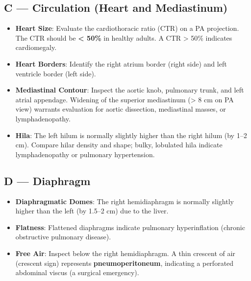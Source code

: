\subsection*{C --- Circulation (Heart and Mediastinum)}
\begin{itemize}
    \item \textbf{Heart Size}: Evaluate the cardiothoracic ratio (CTR) on a PA projection. The CTR should be \textbf{< 50\%} in healthy adults. A CTR > 50\% indicates cardiomegaly.
    \item \textbf{Heart Borders}: Identify the right atrium border (right side) and left ventricle border (left side).
    \item \textbf{Mediastinal Contour}: Inspect the aortic knob, pulmonary trunk, and left atrial appendage. Widening of the superior mediastinum (> 8 cm on PA view) warrants evaluation for aortic dissection, mediastinal masses, or lymphadenopathy.
    \item \textbf{Hila}: The left hilum is normally slightly higher than the right hilum (by 1--2 cm). Compare hilar density and shape; bulky, lobulated hila indicate lymphadenopathy or pulmonary hypertension.
\end{itemize}

\subsection*{D --- Diaphragm}
\begin{itemize}
    \item \textbf{Diaphragmatic Domes}: The right hemidiaphragm is normally slightly higher than the left (by 1.5--2 cm) due to the liver.
    \item \textbf{Flatness}: Flattened diaphragms indicate pulmonary hyperinflation (chronic obstructive pulmonary disease).
    \item \textbf{Free Air}: Inspect below the right hemidiaphragm. A thin crescent of air (crescent sign) represents \textbf{pneumoperitoneum}, indicating a perforated abdominal viscus (a surgical emergency).
\end{itemize}

